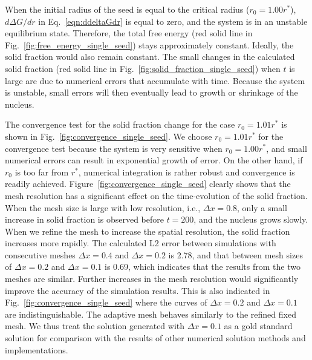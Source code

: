 \documentclass[preprint,12pt]{elsarticle}
\begin{document}
When the initial radius of the seed is equal to the critical radius ($r_0=1.00r^*$),  $d\Delta G/dr$ in Eq.~\ref{eqn:ddeltaGdr} is equal to zero, and the system is in an unstable equilibrium state. Therefore, the total free energy (red solid line in Fig.~\ref{fig:free_energy_single_seed}) stays approximately constant. Ideally, the solid fraction would also remain constant. The small changes in the calculated solid fraction (red solid line in Fig.~\ref{fig:solid_fraction_single_seed}) when $t$ is large are due to numerical errors that accumulate with time. Because the system is unstable, small errors will then eventually lead to growth or shrinkage of the nucleus.

The convergence test for the solid fraction change for the case $r_0=1.01r^*$ is shown in Fig.~\ref{fig:convergence_single_seed}. We choose $r_0=1.01r^*$ for the convergence test because the system is very sensitive when $r_0=1.00r^*$, and small numerical errors can result in exponential growth of error. On the other hand, if $r_0$ is too far from $r^*$, numerical integration is rather robust and convergence is readily achieved. Figure~\ref{fig:convergence_single_seed} clearly shows that the mesh resolution has a significant effect on the time-evolution of the solid fraction. When the mesh size is large with low resolution, i.e., $\Delta x=0.8$, only a small increase in solid fraction is observed before $t=200$, and the nucleus grows slowly. When we refine the mesh to increase the spatial resolution, the solid fraction increases more rapidly. The calculated L2 error between simulations with consecutive meshes $\Delta x=0.4$ and $\Delta x=0.2$ is 2.78, and that between mesh sizes of $\Delta x=0.2$ and $\Delta x=0.1$ is 0.69, which indicates that the results from the two meshes are similar. Further increases in the mesh resolution would significantly improve the accuracy of the simulation results. This is also indicated in Fig.~\ref{fig:convergence_single_seed} where the curves of $\Delta x=0.2$ and $\Delta x=0.1$ are indistinguishable. The adaptive mesh behaves similarly to the refined fixed mesh. We thus treat the solution generated with $\Delta x=0.1$ as a gold standard solution for comparison with the results of other numerical solution methods and implementations. 
\end{document}
